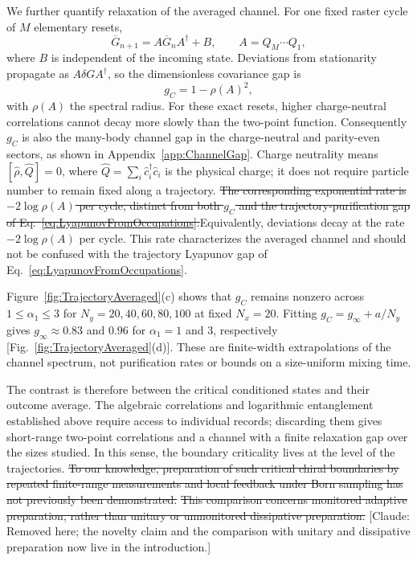 \documentclass[aps,prb,10pt,twocolumn,superscriptaddress,longbibliography,floatfix]{revtex4-2}
\newcommand{\claudeadd}[1]{{\color{orange}#1}}
\newcommand{\claudecom}[1]{{\color{ForestGreen}[Claude: #1]}}
\newcommand{\claudedel}[1]{{\color{orange}\sout{#1}}}
\begin{document}
{\color{blue}
We further quantify relaxation of the averaged channel. For one fixed raster cycle of $M$ elementary resets,
\begin{equation}
 \overline G_{n+1}=A\overline G_nA^\dagger+B,\qquad A=Q_M\cdots Q_1,
 \label{eq:CycleChannel}
\end{equation}
where $B$ is independent of the incoming state. Deviations from stationarity propagate as $A\delta G A^\dagger$, so the dimensionless covariance gap is
\begin{equation}
 g_C=1-\rho(A)^2,
 \label{eq:ChannelGap}
\end{equation}
with $\rho(A)$ the spectral radius. For these exact resets, higher charge-neutral correlations cannot decay more slowly than the two-point function. Consequently $g_C$ is also the many-body channel gap in the charge-neutral and parity-even sectors, as shown in Appendix~\ref{app:ChannelGap}. Charge neutrality means $[\hat\rho,\hat Q]=0$, where $\hat Q=\sum_i\hat c_i^\dagger\hat c_i$ is the physical charge; it does not require particle number to remain fixed along a trajectory. \claudedel{The corresponding exponential rate is $-2\log\rho(A)$ per cycle, distinct from both $g_C$ and the trajectory-purification gap of Eq.~\eqref{eq:LyapunovFromOccupations}.}\claudeadd{Equivalently, deviations decay at the rate $-2\log\rho(A)$ per cycle. This rate characterizes the averaged channel and should not be confused with the trajectory Lyapunov gap of Eq.~\eqref{eq:LyapunovFromOccupations}.}

Figure~\ref{fig:TrajectoryAveraged}(c) shows that $g_C$ remains nonzero across $1\leq\alpha_1\leq3$ for $N_y=20,40,60,80,100$ at fixed $N_x=20$. Fitting $g_C=g_\infty+a/N_y$ gives $g_\infty\approx0.83$ and $0.96$ for $\alpha_1=1$ and $3$, respectively [Fig.~\ref{fig:TrajectoryAveraged}(d)]. These are finite-width extrapolations of the channel spectrum, not purification rates or bounds on a size-uniform mixing time.

The contrast is therefore between the critical conditioned states and their outcome average. The algebraic correlations and logarithmic entanglement established above require access to individual records; discarding them gives short-range two-point correlations and a channel with a finite relaxation gap over the sizes studied. In this sense, the boundary criticality lives at the level of the trajectories. \claudedel{To our knowledge, preparation of such critical chiral boundaries by repeated finite-range measurements and local feedback under Born sampling has not previously been demonstrated.} \claudedel{This comparison concerns monitored adaptive preparation, rather than unitary or unmonitored dissipative preparation.} \claudecom{Removed here; the novelty claim and the comparison with unitary and dissipative preparation now live in the introduction.}
}
\end{document}
